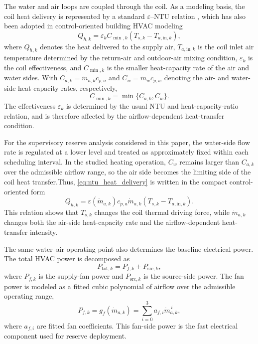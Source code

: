 \documentclass[journal]{IEEEtran}
\theoremstyle{remark}
\begin{document}
	The water and air loops are coupled through the coil. As a modeling basis, the coil heat delivery is represented by a standard $\varepsilon$--NTU relation \cite{sekulic2023fundamentals}, which has also been adopted in control-oriented building HVAC modeling \cite{mantovani2014temperature}
	\begin{equation}
		Q_{h,k}
		=
		\varepsilon_k C_{\min,k}
		\left(T_{s,k}-T_{a,\mathrm{in},k}\right),
		\label{eq:ntu_heat_delivery}
	\end{equation}
	where \(Q_{h,k}\) denotes the heat delivered to the supply air, \(T_{a,\mathrm{in},k}\) is the coil inlet air temperature determined by the return-air and outdoor-air mixing condition, \(\varepsilon_k\) is the coil effectiveness, and \(C_{\min,k}\) is the smaller heat-capacity rate of the air and water sides. With \(C_{a,k}=\dot m_{a,k}c_{p,a}\) and \(C_w=\dot m_w c_{p,w}\) denoting the air- and water-side heat-capacity rates, respectively,
	\begin{equation}
		C_{\min,k}=\min\{C_{a,k},C_w\}.
		\label{eq:capacity_rates}
	\end{equation}
	The effectiveness \(\varepsilon_k\) is determined by the usual NTU and heat-capacity-ratio relation, and is therefore affected by the airflow-dependent heat-transfer condition.
	
	For the supervisory reserve analysis considered in this paper, the water-side flow rate is regulated at a lower level and treated as approximately fixed within each scheduling interval. In the studied heating operation, \(C_w\) remains larger than \(C_{a,k}\) over the admissible airflow range, so the air side becomes the limiting side of the coil heat transfer.Thus, \eqref{eq:ntu_heat_delivery} is written in the compact
	control-oriented form
	\begin{equation}
		Q_{h,k}
		=
		\varepsilon(\dot m_{a,k})
		c_{p,a}\dot m_{a,k}
		\left(T_{s,k}-T_{a,\mathrm{in},k}\right).
		\label{eq:control_heat_delivery}
	\end{equation}
	This relation shows that \(T_{s,k}\) changes the coil thermal driving force, while \(\dot m_{a,k}\) changes both the air-side heat-capacity rate and the airflow-dependent heat-transfer intensity.
	
	The same water--air operating point also determines the baseline electrical power. The total HVAC power is decomposed as
	\begin{equation}
		P_{\mathrm{tot},k}
		=
		P_{f,k}+P_{\mathrm{src},k},
		\label{eq:total_power}
	\end{equation}
	where \(P_{f,k}\) is the supply-fan power and \(P_{\mathrm{src},k}\) is the source-side power. The fan power is modeled as a fitted cubic polynomial of airflow over
	the admissible operating range,
	\begin{equation}
		P_{f,k}=g_f(\dot m_{a,k})
		=
		\sum_{i=0}^{3} a_{f,i}\dot m_{a,k}^{\,i},
		\label{eq:fan_power}
	\end{equation}
	where \(a_{f,i}\) are fitted fan coefficients. This fan-side power is the fast electrical component used for reserve deployment.
	
\end{document}
